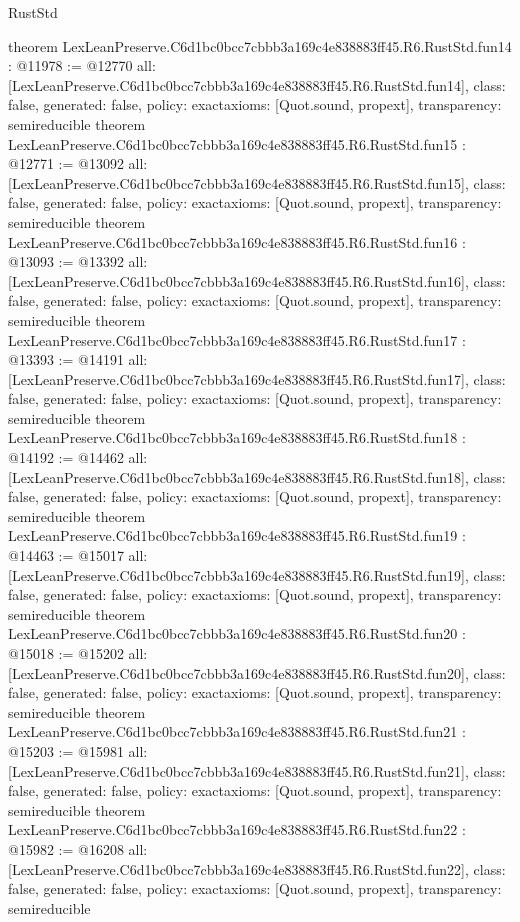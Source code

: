 \begin{lexlean}{RustStd}
\begin{coremodule}
{}
theorem LexLeanPreserve.C6d1bc0bcc7cbbb3a169c4e838883ff45.R6.RustStd.fun14 : @11978 := @12770 {
  all: [LexLeanPreserve.C6d1bc0bcc7cbbb3a169c4e838883ff45.R6.RustStd.fun14],
  class: false,
  generated: false,
  policy: exact{axioms: [Quot.sound, propext]},
  transparency: semireducible
}
theorem LexLeanPreserve.C6d1bc0bcc7cbbb3a169c4e838883ff45.R6.RustStd.fun15 : @12771 := @13092 {
  all: [LexLeanPreserve.C6d1bc0bcc7cbbb3a169c4e838883ff45.R6.RustStd.fun15],
  class: false,
  generated: false,
  policy: exact{axioms: [Quot.sound, propext]},
  transparency: semireducible
}
theorem LexLeanPreserve.C6d1bc0bcc7cbbb3a169c4e838883ff45.R6.RustStd.fun16 : @13093 := @13392 {
  all: [LexLeanPreserve.C6d1bc0bcc7cbbb3a169c4e838883ff45.R6.RustStd.fun16],
  class: false,
  generated: false,
  policy: exact{axioms: [Quot.sound, propext]},
  transparency: semireducible
}
theorem LexLeanPreserve.C6d1bc0bcc7cbbb3a169c4e838883ff45.R6.RustStd.fun17 : @13393 := @14191 {
  all: [LexLeanPreserve.C6d1bc0bcc7cbbb3a169c4e838883ff45.R6.RustStd.fun17],
  class: false,
  generated: false,
  policy: exact{axioms: [Quot.sound, propext]},
  transparency: semireducible
}
theorem LexLeanPreserve.C6d1bc0bcc7cbbb3a169c4e838883ff45.R6.RustStd.fun18 : @14192 := @14462 {
  all: [LexLeanPreserve.C6d1bc0bcc7cbbb3a169c4e838883ff45.R6.RustStd.fun18],
  class: false,
  generated: false,
  policy: exact{axioms: [Quot.sound, propext]},
  transparency: semireducible
}
theorem LexLeanPreserve.C6d1bc0bcc7cbbb3a169c4e838883ff45.R6.RustStd.fun19 : @14463 := @15017 {
  all: [LexLeanPreserve.C6d1bc0bcc7cbbb3a169c4e838883ff45.R6.RustStd.fun19],
  class: false,
  generated: false,
  policy: exact{axioms: [Quot.sound, propext]},
  transparency: semireducible
}
theorem LexLeanPreserve.C6d1bc0bcc7cbbb3a169c4e838883ff45.R6.RustStd.fun20 : @15018 := @15202 {
  all: [LexLeanPreserve.C6d1bc0bcc7cbbb3a169c4e838883ff45.R6.RustStd.fun20],
  class: false,
  generated: false,
  policy: exact{axioms: [Quot.sound, propext]},
  transparency: semireducible
}
theorem LexLeanPreserve.C6d1bc0bcc7cbbb3a169c4e838883ff45.R6.RustStd.fun21 : @15203 := @15981 {
  all: [LexLeanPreserve.C6d1bc0bcc7cbbb3a169c4e838883ff45.R6.RustStd.fun21],
  class: false,
  generated: false,
  policy: exact{axioms: [Quot.sound, propext]},
  transparency: semireducible
}
theorem LexLeanPreserve.C6d1bc0bcc7cbbb3a169c4e838883ff45.R6.RustStd.fun22 : @15982 := @16208 {
  all: [LexLeanPreserve.C6d1bc0bcc7cbbb3a169c4e838883ff45.R6.RustStd.fun22],
  class: false,
  generated: false,
  policy: exact{axioms: [Quot.sound, propext]},
  transparency: semireducible
}
\end{coremodule}
\end{lexlean}

